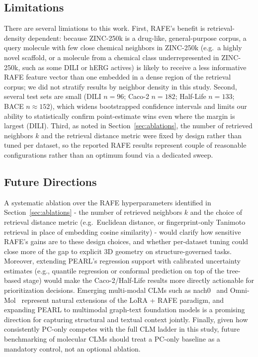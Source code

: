 \documentclass[pdflatex,sn-mathphys-num]{sn-jnl}%
\begin{document}
\subsection{Limitations}\label{sec:limitations}
There are several limiations to this work. First, RAFE's benefit is retrieval-density dependent: because ZINC-250k is a drug-like, general-purpose corpus, a query molecule with few close chemical neighbors in ZINC-250k (e.g.\ a highly novel scaffold, or a molecule from a chemical class underrepresented in ZINC-250k, such as some DILI or hERG actives) is likely to receive a less informative RAFE feature vector than one embedded in a dense region of the retrieval corpus; we did not stratify results by neighbor density in this study. Second, several test sets are small (DILI $n=96$; Caco-2 $n=182$; Half-Life $n=133$; BACE $n\approx152$), which widens bootstrapped confidence intervals and limits our ability to statistically confirm point-estimate wins even where the margin is largest (DILI). Third, as noted in Section~\ref{sec:ablations}, the number of retrieved neighbors $k$ and the retrieval distance metric were fixed by design rather than tuned per dataset, so the reported RAFE results represent couple of reasonable configurations rather than an optimum found via a dedicated sweep.

\subsection{Future Directions}\label{sec:future_work}
A systematic ablation over the RAFE hyperparameters identified in Section~\ref{sec:ablations} - the number of retrieved neighbors $k$ and the choice of retrieval distance metric (e.g.\ Euclidean distance, or fingerprint-only Tanimoto retrieval in place of embedding cosine similarity) - would clarify how sensitive RAFE's gains are to these design choices, and whether per-dataset tuning could close more of the gap to explicit 3D geometry on structure-governed tasks. Moreover, extending PEARL's regression support with calibrated uncertainty estimates (e.g., quantile regression or conformal prediction on top of the tree-based stage) would make the Caco-2/Half-Life results more directly actionable for prioritization decisions. Emerging multi-modal CLMs such as nach0~\cite{livne2024nach0} and Omni-Mol~\cite{hu2025omnimol} represent natural extensions of the LoRA + RAFE paradigm, and expanding PEARL to multimodal graph-text foundation models is a promising direction for capturing structural and textual context jointly. Finally, given how consistently PC-only competes with the full CLM ladder in this study, future benchmarking of molecular CLMs should treat a PC-only baseline as a mandatory control, not an optional ablation.
\end{document}
